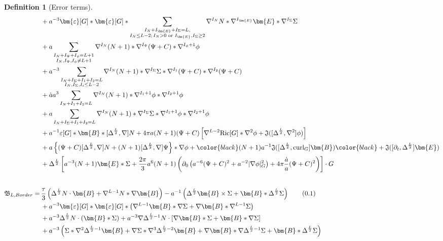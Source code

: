 \documentclass[11pt,leqno,textwidth=10cm]{amsart}
\numberwithin{equation}{section}
\theoremstyle{definition}
\newtheorem{definition}{Definition}[section]
\theoremstyle{plain}
\newcommand{\1}{\mathbbm{1}}
\newcommand{\Ric}{\text{\normalfont{Ric}}}
\renewcommand{\epsilon}{\varepsilon}
\newcommand{\del}{\partial}
\newcommand{\Lap}{\Delta}
\newcommand{\curl}{\text{\normalfont{curl}}}
\newcommand{\numberthis}{\addtocounter{equation}{1}\tag{\theequation}}
\renewcommand{\theequation}{\arabic{section}.\arabic{equation}}
\newcommand{\RE}{\bm{E}}
\newcommand{\RB}{\bm{B}}
\newcommand{\epsilonLC}{\bm{\epsilon}}
\newcommand{\change}[1]{\color{black}#1\color{black}}
\begin{document}
\begin{definition}[Error terms]
{\begin{subequations}
\begin{align*}
&\,+a^{-3}\epsilonLC[G]\ast\epsilonLC[G]\ast\sum_{\substack{I_N+I_{\RE}+I_\Sigma=L,\\ I_N\leq L-2;\,I_N>0\text{ or }I_{\RE},I_{\Sigma}\geq 2}}\nabla^{I_N}N\ast\nabla^{I_{\RE}}\RE\ast\nabla^{I_\Sigma}\Sigma\\
&\,+a\sum_{\substack{I_N+I_\Psi+I_\phi=L+1\\ I_N,I_\Psi,I_\phi\neq L+1}}\nabla^{I_N}(N+1)\ast\nabla^{I_\Psi}(\Psi+C)\ast\nabla^{I_\phi+1}\phi\\
&\,+a^{-3}\sum_{\substack{I_N+I_\Sigma+I_1+I_2=L \\ I_N,I_\Sigma,I_i\leq L-2}}\nabla^{I_N}(N+1)\ast\nabla^{I_\Sigma}\Sigma\ast\nabla^{I_1}(\Psi+C)\ast\nabla^{I_2}(\Psi+C)\\
&\,+\dot{a}a^3\sum_{I_N+I_1+I_2=L}\nabla^{I_N}(N+1)\ast\nabla^{I_1+1}\phi\ast\nabla^{I_2+1}\phi\\
&\,+a\sum_{I_N+I_\Sigma+I_1+I_2=L}\nabla^{I_N}(N+1)\ast\nabla^{I_\Sigma}\Sigma\ast\nabla^{I_1+1}\phi\ast\nabla^{I_2+1}\phi\\
&\,+a^{-1}\epsilon[G]\ast\RB\ast[\Lap^\frac{L}2,\nabla]N+4\pi a(N+1)(\Psi+C)\left[\nabla^{L-2}\Ric[G]\ast\nabla^2\phi+\mathfrak{J}([\Lap^\frac{L}2,\nabla^2]\phi)\right]\\
&\,+a\left\{(\Psi+C)[\Lap^\frac{L}2,\nabla]N+(N+1)[\Lap^\frac{L}2,\nabla]\Psi\right\}\ast\nabla\phi+\change{(N+1)a^{-1}\mathfrak{J}([\Lap^\frac{L}2,\curl_G]\RB)}+\mathfrak{J}([\del_t,\Lap^{\frac{L}2}]\RE)\\
&\,+\Lap^\frac{L}2\left[a^{-3}(N+1)\RE\ast\Sigma+\frac{2\pi}3a^6(N+1)\left(\del_0\left(a^{-6}(\Psi+C)^2+a^{-2}\lvert\nabla\phi\rvert_G^2\right)+4\pi\frac{\dot{a}}a(\Psi+C)^2\right)\right]\cdot G\\[2em]
\mathfrak{B}_{L,Border}=&\,\frac{\tau}3\left(\Lap^{\frac{L}2}N\cdot\RB+\nabla^{L-1}N\ast\nabla\RB\right)-a^{-1}\left(\Lap^{\frac{L}2}\RB\times\Sigma+\RB\ast\Lap^{\frac{L}2}\Sigma\right)\numberthis\label{eq:comeq-RB-border}\\
&\,+a^{-3}\epsilonLC[G]\ast\epsilonLC[G]\ast\left(\nabla^{L-1}\RB\ast\nabla\Sigma+\nabla\RB\ast\nabla^{L-1}\Sigma\right)\\
&\,+a^{-3}\Lap^{\frac{L}2}N\cdot(\RB\ast\Sigma)+a^{-3}\nabla\Lap^{\frac{L}2-1}N\cdot\left[\nabla\RB\ast\Sigma+\RB\ast\nabla\Sigma\right]\\
&\,+a^{-3}\left(\Sigma\ast\nabla^2\Lap^{\frac{L}2-1}\RB+\nabla\Sigma\ast\nabla^3\Lap^{\frac{L}2-2}\RB+\nabla\RB\ast\nabla\Lap^{\frac{L}2-1}\Sigma+\RB\ast\Lap^{\frac{L}2}\Sigma\right)\\

\end{align*}
\end{subequations}}
\end{definition}
\end{document}
